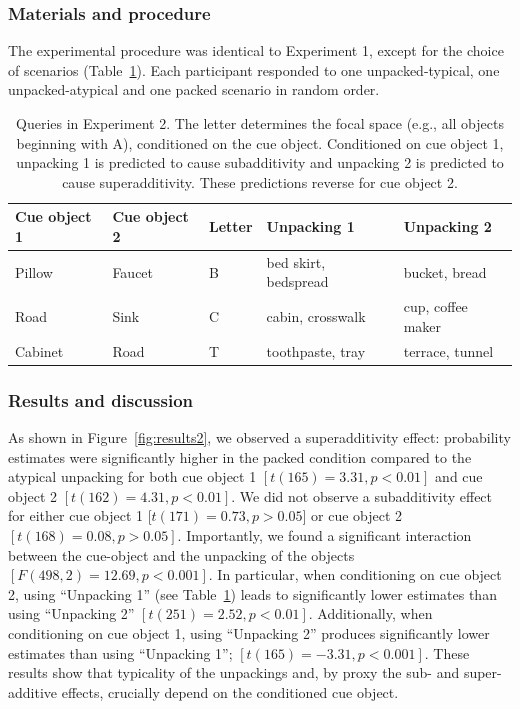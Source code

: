 \subsubsection{Materials and procedure}
The experimental procedure was identical to Experiment 1, except for the choice of scenarios (Table~\ref{tab:scenarios2}). Each participant responded to one unpacked-typical, one unpacked-atypical and one packed scenario in random order.



\begin{table}[htbp]
\caption{Queries in Experiment 2. The letter determines the focal space (e.g., all objects beginning with A), conditioned on the cue object. Conditioned on cue object 1, unpacking 1 is predicted to cause subadditivity and unpacking 2 is predicted to cause superadditivity. These predictions reverse for cue object 2.}
\label{tab:scenarios2}
  \begin{center} 
\begin{tabular}{p{} p{} p{} >{\raggedright}p{} >{\raggedright}p{}}
  \toprule
\bf{Cue object 1}&\bf{Cue object 2}&\bf{Letter}&\bf{Unpacking 1} &\bf{Unpacking 2}\tabularnewline
\midrule
Pillow & Faucet & B & bed skirt, bedspread\ & bucket, bread\tabularnewline
Road & Sink & C & cabin, crosswalk & cup, coffee maker\tabularnewline
Cabinet & Road & T & toothpaste, tray & terrace, tunnel\tabularnewline
\bottomrule
\end{tabular}
\end{center}
\end{table}

\subsubsection{Results and discussion}
As shown in Figure~\ref{fig:results2}, we observed a superadditivity effect: probability estimates were significantly higher in the packed condition compared to the atypical unpacking for both cue object 1 $[t(165)=3.31, p<0.01]$ and cue object 2 $[t(162)=4.31, p<0.01]$. We did not observe a subadditivity effect for either cue object 1 [$t(171)=0.73, p>0.05]$ or cue object 2 $[t(168)=0.08, p>0.05]$. Importantly, we found a significant interaction between the cue-object and the unpacking of the objects $[F(498, 2)=12.69, p<0.001]$. In particular, when conditioning on cue object 2, using ``Unpacking 1'' (see Table~\ref{tab:scenarios2}) leads to significantly lower estimates than using ``Unpacking 2'' $[t(251)=2.52 , p<0.01]$. Additionally, when conditioning on cue object 1, using ``Unpacking 2'' produces significantly lower estimates than using ``Unpacking 1''; $[t(165)=-3.31, p<0.001]$. These results show that typicality of the unpackings and, by proxy the sub- and super-additive effects, crucially depend on the conditioned cue object.

